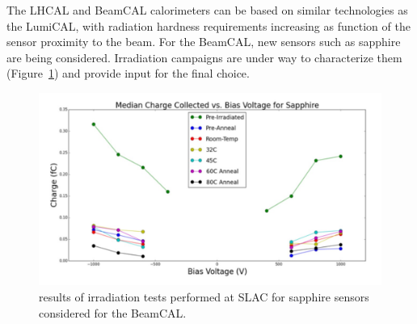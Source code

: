 The LHCAL and BeamCAL calorimeters can be based on similar technologies as the LumiCAL, with radiation hardness requirements increasing as function of the sensor proximity to the beam. For the BeamCAL, new sensors such as sapphire are being considered. Irradiation campaigns are under way to characterize them (Figure~\ref{fig:det:BEAMCAL_rad}) and provide input for the final choice. 

\begin{figure}[t!]
\centering
\includegraphics[width=0.8\hsize]{Detector/fig/BEAMCAL_rad.jpg}
\caption{results of irradiation tests performed at SLAC for sapphire sensors considered for the BeamCAL.}
\label{fig:det:BEAMCAL_rad}
\end{figure}